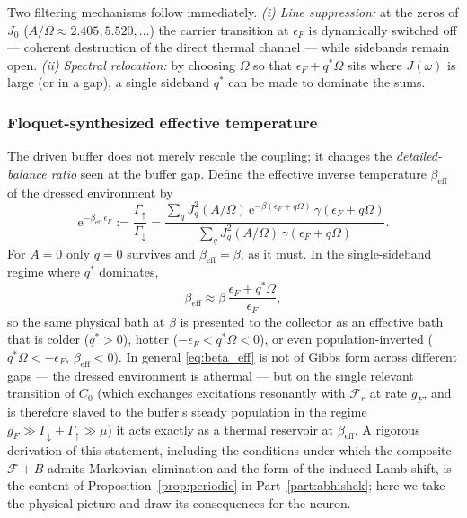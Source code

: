 \documentclass[11pt,a4paper]{article}
\theoremstyle{definition}
\theoremstyle{remark}
\newcommand{\ee}{\mathrm{e}}
\begin{document}
Two filtering mechanisms follow immediately.
\emph{(i) Line suppression:} at the zeros of $J_0$
($A/\Omega \approx 2.405, 5.520,\dots$) the carrier transition at
$\epsilon_F$ is dynamically switched off --- coherent destruction of
the direct thermal channel --- while sidebands remain open. \emph{(ii)
Spectral relocation:} by choosing $\Omega$ so that
$\epsilon_F + q^\ast\Omega$ sits where $J(\omega)$ is large (or in a
gap), a single sideband $q^\ast$ can be made to dominate the sums.
 
\subsubsection{Floquet-synthesized effective temperature}
\label{sec:eff-temp}
The driven buffer does not merely rescale the coupling; it changes the
\emph{detailed-balance ratio} seen at the buffer gap. Define the
effective inverse temperature $\beta_{\mathrm{eff}}$ of the dressed
environment by
\begin{equation}
\ee^{-\beta_{\mathrm{eff}}\,\epsilon_F}
:= \frac{\Gamma_\uparrow}{\Gamma_\downarrow}
= \frac{\sum_q J_q^2(A/\Omega)\,
\ee^{-\beta(\epsilon_F+q\Omega)}\,\gamma(\epsilon_F+q\Omega)}
{\sum_q J_q^2(A/\Omega)\,\gamma(\epsilon_F+q\Omega)} .
\label{eq:beta_eff}
\end{equation}
For $A=0$ only $q=0$ survives and $\beta_{\mathrm{eff}}=\beta$, as it
must. In the single-sideband regime where $q^\ast$ dominates,
\begin{equation}
\beta_{\mathrm{eff}}
\approx \beta\,\frac{\epsilon_F+q^\ast\Omega}{\epsilon_F},
\label{eq:beta_eff_single}
\end{equation}
so the same physical bath at $\beta$ is presented to the collector as
an effective bath that is colder ($q^\ast>0$), hotter
($-\epsilon_F<q^\ast\Omega<0$), or even population-inverted
($q^\ast\Omega<-\epsilon_F$, $\beta_{\mathrm{eff}}<0$). In general
\eqref{eq:beta_eff} is not of Gibbs form across different gaps --- the
dressed environment is athermal --- but on the single relevant
transition of $C_0$ (which exchanges excitations resonantly with
$\mathcal{F}_r$ at rate $g_F$, and is therefore slaved to the buffer's
steady population in the regime
$g_F \gg \Gamma_\downarrow+\Gamma_\uparrow \gg \mu$) it acts exactly as
a thermal reservoir at $\beta_{\mathrm{eff}}$. A rigorous derivation of
this statement, including the conditions under which the composite
$\mathcal{F}\!+\!B$ admits Markovian elimination and the form of the
induced Lamb shift, is the content of
Proposition~\ref{prop:periodic} in Part~\ref{part:abhishek}; here we
take the physical picture and draw its consequences for the neuron.
 
\end{document}
